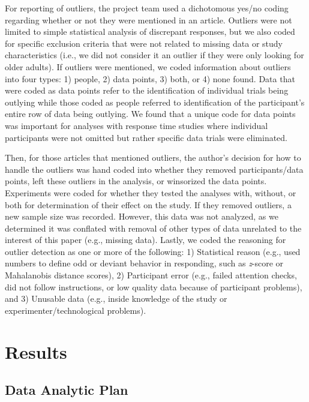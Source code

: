 \documentclass[english,,man,mask]{apa6}
\theoremstyle{definition}
\theoremstyle{definition}
\theoremstyle{definition}
\theoremstyle{remark}
\begin{document}
For reporting of outliers, the project team used a dichotomous yes/no
coding regarding whether or not they were mentioned in an article.
Outliers were not limited to simple statistical analysis of discrepant
responses, but we also coded for specific exclusion criteria that were
not related to missing data or study characteristics (i.e., we did not
consider it an outlier if they were only looking for older adults). If
outliers were mentioned, we coded information about outliers into four
types: 1) people, 2) data points, 3) both, or 4) none found. Data that
were coded as data points refer to the identification of individual
trials being outlying while those coded as people referred to
identification of the participant's entire row of data being outlying.
We found that a unique code for data points was important for analyses
with response time studies where individual participants were not
omitted but rather specific data trials were eliminated.

Then, for those articles that mentioned outliers, the author's decision
for how to handle the outliers was hand coded into whether they removed
participants/data points, left these outliers in the analysis, or
winsorized the data points. Experiments were coded for whether they
tested the analyses with, without, or both for determination of their
effect on the study. If they removed outliers, a new sample size was
recorded. However, this data was not analyzed, as we determined it was
conflated with removal of other types of data unrelated to the interest
of this paper (e.g., missing data). Lastly, we coded the reasoning for
outlier detection as one or more of the following: 1) Statistical reason
(e.g., used numbers to define odd or deviant behavior in responding,
such as \emph{z}-score or Mahalanobis distance scores), 2) Participant
error (e.g., failed attention checks, did not follow instructions, or
low quality data because of participant problems), and 3) Unusable data
(e.g., inside knowledge of the study or experimenter/technological
problems).

\section{Results}\label{results}

\subsection{Data Analytic Plan}\label{data-analytic-plan}
\end{document}

